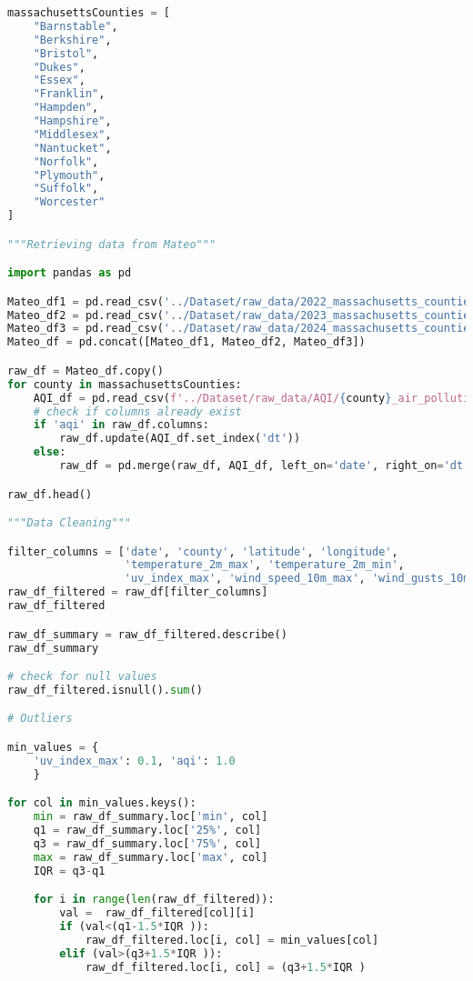 \documentclass[a4paper, 12pt]{article}
\begin{document}
\begin{lstlisting}[language=Python, caption=Data Cleaning Code]
massachusettsCounties = [
    "Barnstable",
    "Berkshire",
    "Bristol",
    "Dukes",
    "Essex",
    "Franklin",
    "Hampden",
    "Hampshire",
    "Middlesex",
    "Nantucket",
    "Norfolk",
    "Plymouth",
    "Suffolk",
    "Worcester"
]

"""Retrieving data from Mateo"""

import pandas as pd

Mateo_df1 = pd.read_csv('../Dataset/raw_data/2022_massachusetts_counties_weather_data.csv')
Mateo_df2 = pd.read_csv('../Dataset/raw_data/2023_massachusetts_counties_weather_data.csv')
Mateo_df3 = pd.read_csv('../Dataset/raw_data/2024_massachusetts_counties_weather_data.csv')
Mateo_df = pd.concat([Mateo_df1, Mateo_df2, Mateo_df3])

raw_df = Mateo_df.copy()
for county in massachusettsCounties:
    AQI_df = pd.read_csv(f'../Dataset/raw_data/AQI/{county}_air_pollution_history.csv')
    # check if columns already exist
    if 'aqi' in raw_df.columns:
        raw_df.update(AQI_df.set_index('dt'))
    else:
        raw_df = pd.merge(raw_df, AQI_df, left_on='date', right_on='dt', how='left')

raw_df.head()

"""Data Cleaning"""

filter_columns = ['date', 'county', 'latitude', 'longitude',
                  'temperature_2m_max', 'temperature_2m_min',
                  'uv_index_max', 'wind_speed_10m_max', 'wind_gusts_10m_max','aqi', 'daylight_duration', 'sunshine_duration', 'weather_code']
raw_df_filtered = raw_df[filter_columns]
raw_df_filtered

raw_df_summary = raw_df_filtered.describe()
raw_df_summary

# check for null values
raw_df_filtered.isnull().sum()

# Outliers

min_values = {
    'uv_index_max': 0.1, 'aqi': 1.0
    }

for col in min_values.keys():
    min = raw_df_summary.loc['min', col]
    q1 = raw_df_summary.loc['25%', col]
    q3 = raw_df_summary.loc['75%', col]
    max = raw_df_summary.loc['max', col]
    IQR = q3-q1

    for i in range(len(raw_df_filtered)):
        val =  raw_df_filtered[col][i]
        if (val<(q1-1.5*IQR )):
            raw_df_filtered.loc[i, col] = min_values[col]
        elif (val>(q3+1.5*IQR )):
            raw_df_filtered.loc[i, col] = (q3+1.5*IQR )


\end{lstlisting}
\end{document}
